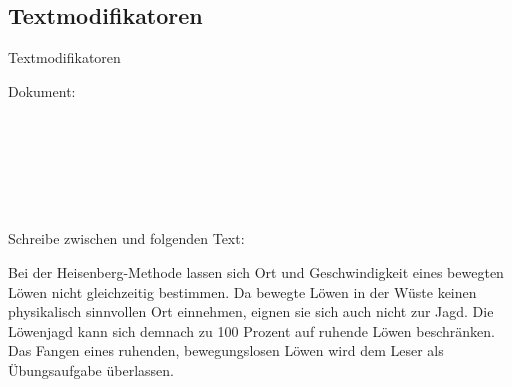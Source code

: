 \subsection{Textmodifikatoren}
\begin{frame}[c]
	\begin{center}
		\large Textmodifikatoren
	\end{center}
\end{frame}
\begin{frame}[fragile]
	Dokument:
	\begin{lstlisting}[breaklines=true,gobble=8]
		
		
		
		
		
		
	\end{lstlisting}
	\pause\btVFill
	\Aufgabee
	Schreibe zwischen \lstinline[basicstyle=\normalfont\ttfamily\normalsize]|| und \lstinline[basicstyle=\normalfont\ttfamily\normalsize]|| folgenden Text:
	\begin{outputbox}
		Bei der Heisenberg-Methode lassen sich Ort und Geschwindigkeit eines bewegten Löwen nicht gleichzeitig bestimmen. Da bewegte Löwen in der Wüste keinen physikalisch sinnvollen Ort einnehmen, eignen sie sich auch nicht zur Jagd. Die Löwenjagd kann sich demnach zu 100 Prozent auf ruhende Löwen beschränken. Das Fangen eines ruhenden, bewegungslosen Löwen wird dem Leser als Übungsaufgabe überlassen.
	\end{outputbox}
	\vspace{0.2cm}
\end{frame}
